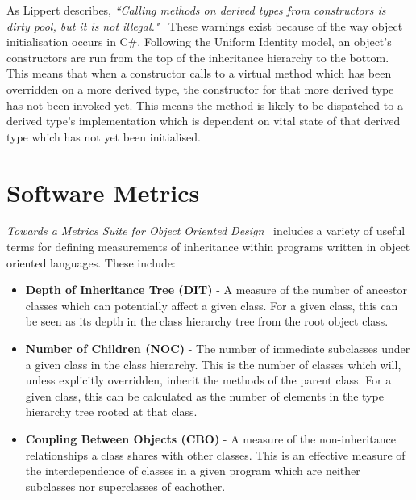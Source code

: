 As Lippert describes, \textit{``Calling methods on derived types from constructors is dirty pool, but it is not illegal."}~\cite{NoDowncalls} These warnings exist because of the way object initialisation occurs in C\#. Following the Uniform Identity model, an object's constructors are run from the top of the inheritance hierarchy to the bottom. This means that when a constructor calls to a virtual method which has been overridden on a more derived type, the constructor for that more derived type has not been invoked yet. This means the method is likely to be dispatched to a derived type's implementation which is dependent on vital state of that derived type which has not yet been initialised.

\section{Software Metrics}
\textit{Towards a Metrics Suite for Object Oriented Design}~\cite{MetricsSuite} includes a variety of useful terms for defining measurements of inheritance within programs written in object oriented languages. These include:
\begin{itemize}
	\item \textbf{Depth of Inheritance Tree (DIT)} - A measure of the number of ancestor classes which can potentially affect a given class. For a given class, this can be seen as its depth in the class hierarchy tree from the root object class.
	\item \textbf{Number of Children (NOC)} - The number of immediate subclasses under a given class in the class hierarchy. This is the number of classes which will, unless explicitly overridden, inherit the methods of the parent class. For a given class, this can be calculated as the number of elements in the type hierarchy tree rooted at that class.
	\item \textbf{Coupling Between Objects (CBO)} - A measure of the non-inheritance relationships a class shares with other classes. This is an effective measure of the interdependence of classes in a given program which are neither subclasses nor superclasses of eachother.
	\newline
\end{itemize}

